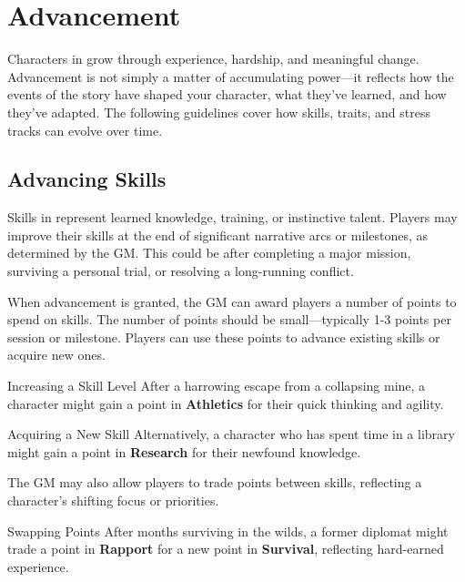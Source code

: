 \section{Advancement}

Characters in \wyrd grow through experience, hardship, and meaningful change. Advancement is not simply a matter of accumulating power—it reflects how the events of the story have shaped your character, what they’ve learned, and how they’ve adapted. The following guidelines cover how skills, traits, and stress tracks can evolve over time.

\subsection{Advancing Skills}

Skills in \wyrd represent learned knowledge, training, or instinctive talent. Players may improve their skills at the end of significant narrative arcs or milestones, as determined by the GM. This could be after completing a major mission, surviving a personal trial, or resolving a long-running conflict.

When advancement is granted, the GM can award players a number of points to spend on skills. The number of points should be small—typically 1-3 points per session or milestone. Players can use these points to advance existing skills or acquire new ones.

\begin{Example}{Increasing a Skill Level}
    After a harrowing escape from a collapsing mine, a character might gain a point in \textbf{Athletics} for their quick thinking and agility.
\end{Example}

\begin{Example}{Acquiring a New Skill}
    Alternatively, a character who has spent time in a library might gain a point in \textbf{Research} for their newfound knowledge.
\end{Example}

\noindent
The GM may also allow players to trade points between skills, reflecting a character’s shifting focus or priorities.

\begin{Example}{Swapping Points}
    After months surviving in the wilds, a former diplomat might trade a point in \textbf{Rapport} for a new point in \textbf{Survival}, reflecting hard-earned experience.
\end{Example}

